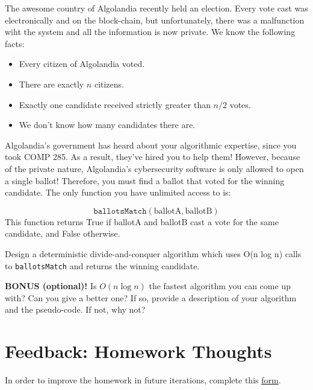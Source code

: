 \documentclass [12pt]{article}
\begin{document}
The awesome country of Algolandia recently held an election. Every vote cast was electronically and on the block-chain, but unfortunately, there was a malfunction wiht the system and all the information is now private. We know the following facts:

\begin{itemize}
    \item Every citizen of Algolandia voted.
    \item There are exactly $n$ citizens.
    \item Exactly one candidate received strictly greater than $n/2$ votes.
    \item We don't know how many candidates there are.
\end{itemize}

Algolandia’s government has heard about your algorithmic expertise, since you took COMP 285. As a result, they’ve hired you to help them! However, because of the private nature, Algolandia’s cybersecurity software is only allowed to open a single ballot! Therefore, you must find a ballot that voted for the winning candidate. The only function you have unlimited access to is:

$$
\texttt{ballotsMatch}(\text{ballotA}, \text{ballotB})
$$
This function returns True if ballotA and ballotB cast a vote for the same candidate, and False otherwise.

Design a deterministic divide-and-conquer algorithm which uses O(n log n) calls to \texttt{ballotsMatch} and returns the winning candidate.


\textbf{BONUS (optional)!} Is $O(n \log n)$ the fastest algorithm you can come up with? Can you give a better one? If so, provide a description of your algorithm and the pseudo-code. If not, why not?

\pagebreak
\section{Feedback: Homework Thoughts }

In order to improve the homework in future iterations, complete this \href{https://forms.gle/LwMVLqf3FFuhJxVv7}{form}.


\end{document}
